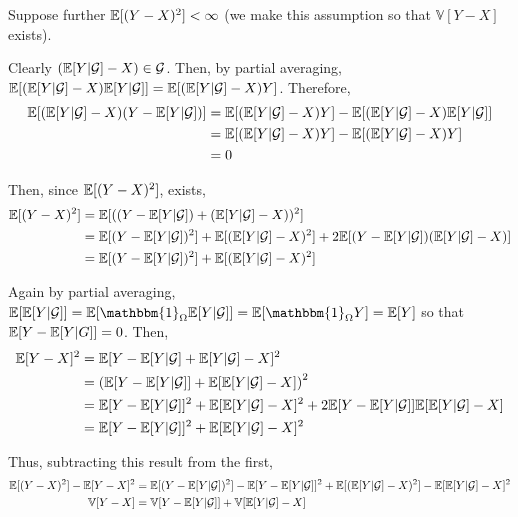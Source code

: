 \documentclass[10pt]{article}
\begin{document}
\begin{solution}[Solution]

Suppose further \( \mathbb{E}[(Y-X)^2]<\infty \) (we make this assumption so that \( \mathbb{V}[Y-X] \) exists).

Clearly \( (\mathbb{E}[Y|\mathcal{G}]-X)\in \mathcal{G} \). Then, by partial averaging, \( \mathbb{E}[(\mathbb{E}[Y|\mathcal{G}]-X)\mathbb{E}[Y|\mathcal{G}]] = \mathbb{E}[(\mathbb{E}[Y|\mathcal{G}]-X)Y] \). Therefore,
\begin{align*}
    \mathbb{E}[(\mathbb{E}[Y|\mathcal{G}]-X)(Y-\mathbb{E}[Y|\mathcal{G}])] &= \mathbb{E}[(\mathbb{E}[Y|\mathcal{G}]-X)Y]-\mathbb{E}[(\mathbb{E}[Y|\mathcal{G}]-X)\mathbb{E}[Y|\mathcal{G}]] \\
    &= \mathbb{E}[(\mathbb{E}[Y|\mathcal{G}]-X)Y] - \mathbb{E}[(\mathbb{E}[Y|\mathcal{G}]-X)Y] \\
    &= 0
\end{align*}

Then, since \( \mathbb{E}[(Y-X)^2] \), exists,
\begin{align*}
    \mathbb{E}[(Y-X)^2] &= \mathbb{E}[((Y-\mathbb{E}[Y|\mathcal{G}])+(\mathbb{E}[Y|\mathcal{G}]-X))^2] \\
    &= \mathbb{E}[(Y-\mathbb{E}[Y|\mathcal{G}])^2]+\mathbb{E}[(\mathbb{E}[Y|\mathcal{G}]-X)^2] + 2\mathbb{E}[(Y-\mathbb{E}[Y|\mathcal{G}])(\mathbb{E}[Y|\mathcal{G}]-X)] \\
    &= \mathbb{E}[(Y-\mathbb{E}[Y|\mathcal{G}])^2]+\mathbb{E}[(\mathbb{E}[Y|\mathcal{G}]-X)^2]
\end{align*}

Again by partial averaging, \( \EE[\EE[Y|\mathcal{G}]] = \EE[\mathbbm{1}_{\Omega}\EE[Y|\mathcal{G}]] = \EE[\mathbbm{1}_{\Omega}Y] = \EE[Y] \) so that \( \mathbb{E}[Y-\mathbb{E}[Y|G]] = 0 \). Then,
\begin{align*}
    \mathbb{E}[Y-X]^2 &= \mathbb{E}[Y-\mathbb{E}[Y|\mathcal{G}]+\mathbb{E}[Y|\mathcal{G}]-X]^2 \\
    &= \left(\mathbb{E}[Y-\mathbb{E}[Y|\mathcal{G}]]+\mathbb{E}[\mathbb{E}[Y|\mathcal{G}]-X]\right)^2 \\
    &= \mathbb{E}[Y-\mathbb{E}[Y|\mathcal{G}]]^2+\mathbb{E}[\mathbb{E}[Y|\mathcal{G}]-X]^2+2\mathbb{E}[Y-\mathbb{E}[Y|\mathcal{G}]]\mathbb{E}[\mathbb{E}[Y|\mathcal{G}]-X] \\
    &= \mathbb{E}[Y-\mathbb{E}[Y|\mathcal{G}]]^2+\mathbb{E}[\mathbb{E}[Y|\mathcal{G}]-X]^2
\end{align*}

Thus, subtracting this result from the first,
\begin{align*}
    \mathbb{E}[(Y-X)^2]-\mathbb{E}[Y-X]^2 &= \mathbb{E}[(Y-\mathbb{E}[Y|\mathcal{G}])^2]-\mathbb{E}[Y-\mathbb{E}[Y|\mathcal{G}]]^2+\mathbb{E}[(\mathbb{E}[Y|\mathcal{G}]-X)^2]-\mathbb{E}[\mathbb{E}[Y|\mathcal{G}]-X]^2 \\
    \mathbb{V}[Y-X] &= \mathbb{V}[Y-\mathbb{E}[Y|\mathcal{G}]]+\mathbb{V}[\mathbb{E}[Y|\mathcal{G}]-X]
\end{align*}


\end{solution}
\end{document}
